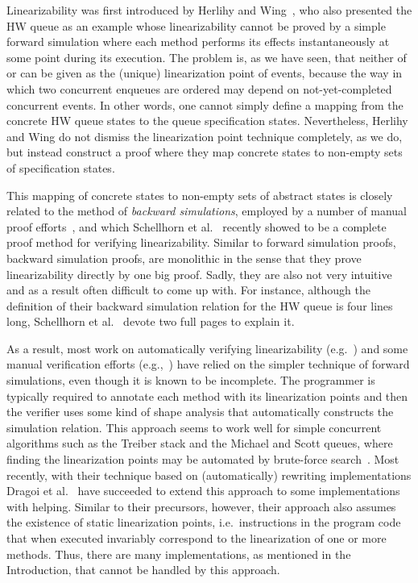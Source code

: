\documentclass{LMCS}
\begin{document}
Linearizability was first introduced by Herlihy and Wing~\cite{HW1990}, who
also presented the HW queue as an example whose linearizability cannot be proved
by a simple forward simulation where each method performs its effects
instantaneously at some point during its execution.
The problem is, as we have seen, that neither of  or  can be given
as the (unique) linearization point of  events, because the way in which
two concurrent enqueues are ordered may depend on not-yet-completed concurrent
 events.  In other words, one cannot simply define a mapping from the
concrete HW queue states to the queue specification states. 
Nevertheless, Herlihy and Wing do not dismiss the linearization point technique
completely, as we do, but instead construct a proof where they map concrete
states to non-empty sets of specification states.  

This mapping of concrete states to non-empty sets of abstract states is closely
related to the method of \emph{backward simulations}, employed by a number of
manual proof efforts~\cite{CDG2005,DM2009,SWD2012}, 
and which Schellhorn et al.~\cite{SWD2012} recently showed to be a complete
proof method for verifying linearizability.
Similar to forward simulation proofs, backward simulation proofs, are monolithic 
in the sense that they prove linearizability directly by one big proof.
Sadly, they are also not very intuitive and as a result often difficult to come
up with. For instance, although the definition of their backward simulation
relation for the HW queue is four lines long, Schellhorn et al.~\cite{SWD2012}
devote two full pages to explain it.

As a result, most work on automatically verifying linearizability
(e.g.~\cite{ARR+2007,Vaf2009,Vaf2010,AHH+2013,DGH2013}) and some
manual verification efforts (e.g.,~\cite{DSW2011,CDG2005}) have relied on the simpler
technique of forward simulations, even though it is known to be incomplete.
The programmer is typically required to annotate each method with its
linearization points and then the verifier uses some kind of shape analysis
that automatically constructs the simulation relation. 
This approach seems to work well for simple concurrent algorithms such as the
Treiber stack and the Michael and Scott queues, where finding the linearization
points may be automated by brute-force search~\cite{Vaf2010}.
Most recently, with their technique based on (automatically) rewriting implementations Dragoi et al.~\cite{DGH2013} have succeeded to extend this approach to some implementations with helping.
Similar to their precursors, however, their approach also assumes the existence of static linearization points, i.e.\ instructions in the program code that when executed invariably correspond to the linearization of one or more methods.
Thus, there are many implementations, as mentioned in the Introduction, that cannot be handled by this approach.
\end{document}
